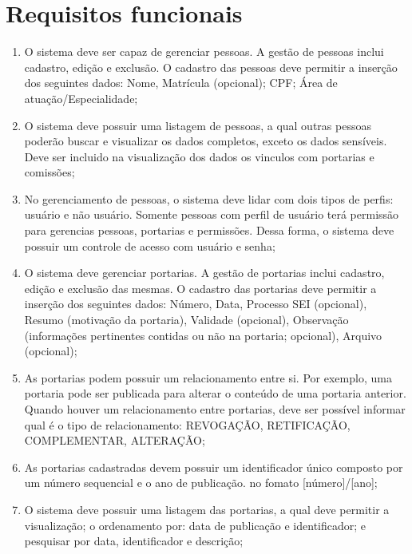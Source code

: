 \documentclass{scrreprt}
\begin{document}
\section{Requisitos funcionais}
\begin{enumerate}[label=\textbf{RF-\arabic*}]
\item
O sistema deve ser capaz de gerenciar pessoas. A gestão de pessoas inclui cadastro, edição e exclusão. O cadastro das pessoas deve permitir a inserção dos seguintes dados: Nome, Matrícula (opcional); CPF; Área de atuação/Especialidade;

\item
O sistema deve possuir uma listagem de pessoas, a qual outras pessoas poderão  buscar e visualizar os dados completos, exceto os dados sensíveis. Deve ser incluido na visualização dos dados os vinculos com portarias e comissões;

\item
No gerenciamento de pessoas, o sistema deve lidar com dois tipos de perfis:
usuário e não usuário. Somente pessoas com perfil de usuário terá permissão para gerencias pessoas, portarias e permissões. Dessa forma, o sistema deve possuir um controle de acesso com usuário e senha;

\item
O sistema deve gerenciar portarias. A gestão de portarias inclui cadastro, edição e exclusão das mesmas. O cadastro das portarias deve permitir a inserção dos seguintes dados: Número, Data, Processo SEI (opcional), Resumo (motivação da portaria), Validade (opcional), Observação (informações pertinentes contidas ou não na portaria; opcional), Arquivo (opcional);

\item
As portarias podem possuir um relacionamento entre si. Por exemplo, uma portaria pode ser publicada para alterar o conteúdo de uma portaria anterior. Quando houver um relacionamento entre portarias, deve ser possível informar qual é o tipo de relacionamento: REVOGAÇÃO, RETIFICAÇÃO, COMPLEMENTAR, ALTERAÇÃO;

\item
As portarias cadastradas devem possuir um identificador único composto por um número sequencial e o ano de publicação. no fomato [número]/[ano];

\item
O sistema deve possuir uma listagem das portarias, a qual deve permitir a visualização; o ordenamento por:  data de publicação e identificador; e pesquisar por data, identificador e descrição;


\end{enumerate}
\end{document}
